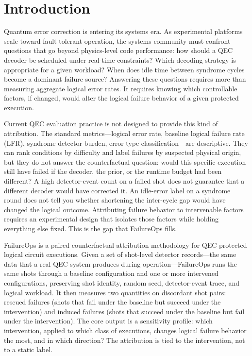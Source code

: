 \section{Introduction}

Quantum error correction is entering its systems era. As experimental platforms scale toward fault-tolerant operation, the systems community must confront questions that go beyond physics-level code performance: how should a QEC decoder be scheduled under real-time constraints? Which decoding strategy is appropriate for a given workload? When does idle time between syndrome cycles become a dominant failure source? Answering these questions requires more than measuring aggregate logical error rates. It requires knowing which controllable factors, if changed, would alter the logical failure behavior of a given protected execution.

Current QEC evaluation practice is not designed to provide this kind of attribution. The standard metrics---logical error rate, baseline logical failure rate (LFR), syndrome-detector burden, error-type classification---are descriptive. They can rank conditions by difficulty and label failures by suspected physical origin, but they do not answer the counterfactual question: would this specific execution still have failed if the decoder, the prior, or the runtime budget had been different? A high detector-event count on a failed shot does not guarantee that a different decoder would have corrected it. An idle-error label on a syndrome round does not tell you whether shortening the inter-cycle gap would have changed the logical outcome. Attributing failure behavior to intervenable factors requires an experimental design that isolates those factors while holding everything else fixed. This is the gap that FailureOps fills.

FailureOps is a paired counterfactual attribution methodology for QEC-protected logical circuit executions. Given a set of shot-level detector records---the same data that a real QEC system produces during operation---FailureOps runs the same shots through a baseline configuration and one or more intervened configurations, preserving shot identity, random seed, detector-event trace, and logical workload. It then measures two quantities on discordant shot pairs: rescued failures (shots that fail under the baseline but succeed under the intervention) and induced failures (shots that succeed under the baseline but fail under the intervention). The core output is a sensitivity profile: which intervention, applied to which class of executions, changes logical failure behavior the most, and in which direction? The attribution is tied to the intervention, not to a static label.

